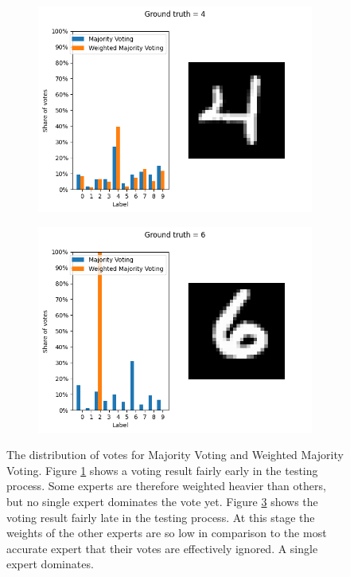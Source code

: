 \begin{figure}
    \begin{subfigure}{.5\textwidth}
        \centering
        \includegraphics[width=\linewidth]{figures/mv-vs-wmv-1.png}
        \caption{}
        \label{fig:mv-vs-wvm-vote-a}
    \end{subfigure}
    \begin{subfigure}{.5\textwidth}
        \centering
        \includegraphics[width=\linewidth]{figures/mv-vs-wmv-2.png}
        \caption{}
        \label{fig:mv-vs-wvm-vote-b}
    \end{subfigure}
    \caption{The distribution of votes for Majority Voting and Weighted Majority Voting. Figure \ref{fig:mv-vs-wvm-vote-a} shows a voting result fairly early in the testing process. Some experts are therefore weighted heavier than others, but no single expert dominates the vote yet. Figure \ref{fig:mv-vs-wvm-vote-b} shows the voting result fairly late in the testing process. At this stage the weights of the other experts are so low in comparison to the most accurate expert that their votes are effectively ignored. A single expert dominates.}
\end{figure} \label{fig:mv-vs-wvm-vote}

